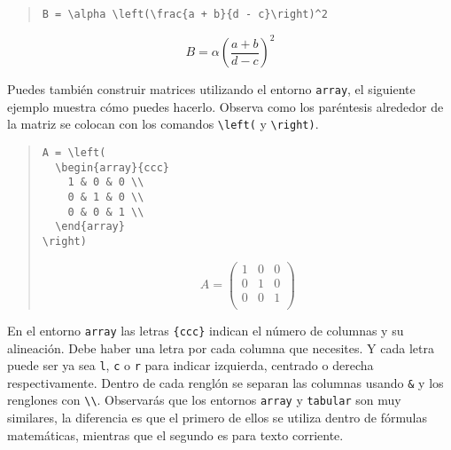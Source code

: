 \begin{quote}
\begin{verbatim}
B = \alpha \left(\frac{a + b}{d - c}\right)^2
\end{verbatim}
\end{quote}
\begin{displaymath}
B = \alpha \left(\frac{a + b}{d - c}\right)^2
\end{displaymath}

Puedes  tambi\'en construir matrices utilizando el entorno \texttt{array}, el siguiente 
ejemplo muestra c\'omo puedes hacerlo. Observa como los par\'entesis alrededor de la matriz se colocan con
los comandos \verb|\left(| y \verb|\right)|.

\begin{quote}
\begin{minipage}{0.4\textwidth}
\begin{verbatim}
A = \left(
  \begin{array}{ccc}
    1 & 0 & 0 \\
    0 & 1 & 0 \\
    0 & 0 & 1 \\
  \end{array}
\right) 
\end{verbatim}
\end{minipage}
\begin{minipage}{0.4\textwidth}
\begin{displaymath}
A = \left(
  \begin{array}{ccc}
    1 & 0 & 0 \\
    0 & 1 & 0 \\
    0 & 0 & 1 \\
  \end{array}
\right) 
\end{displaymath}
\end{minipage}
\end{quote}

En el entorno \texttt{array} las letras \verb|{ccc}| indican el n\'umero de columnas y su alineaci\'on.
Debe haber una letra por cada columna que necesites. Y cada letra puede ser ya sea
\verb|l|, \verb|c| o \verb|r| para indicar izquierda, centrado o derecha
respectivamente. Dentro de cada rengl\'on se separan las columnas usando \verb|&|
y los renglones con  \verb|\\|. Observar\'as que los entornos \texttt{array} y
\texttt{tabular} son muy similares, la diferencia es que el primero de ellos se utiliza
dentro de f\'ormulas matem\'aticas, mientras que el segundo es para texto corriente.

